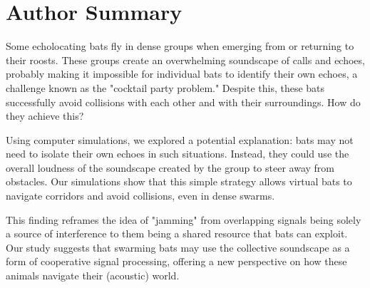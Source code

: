 \documentclass[a4paper, 11pt]{article}
\begin{document}
\begin{abstract}
    Some echolocating bats, such as \textit{Tadarida brasiliensis}, fly in groups when emerging from or entering caves. In large, dense swarms, distinguishing self-generated echoes from the multitude of calls and echoes produced by others presents a significant challenge -- akin to a cocktail party nightmare. While spectral jamming responses have been proposed as a solution, this mechanism is unlikely to be effective in such conditions. Here, we propose an alternative hypothesis: rather than isolating their own echoes, bats might navigate by relying on the local amplitude gradient of the collective soundscape. To test this, we developed an agent-based simulation of bats flying through corridors, demonstrating that they can avoid obstacles, including other bats and corridor walls, without distinguishing individual echoes. Our findings suggest that in dense swarms, bats can exploit the emergent acoustic environment to maintain safe distances passively. The current paper also suggests shifting the perspective on jamming itself. Rather than framing overlapping signals solely as a source of interference, our findings highlight that these signals can also carry useful information, reframing the problem from conflict to cooperative signal processing.
\end{abstract}

\section{Author Summary}

Some echolocating bats fly in dense groups when emerging from or returning to their roosts. These groups create an overwhelming soundscape of calls and echoes, probably making it impossible for individual bats to identify their own echoes, a challenge known as the "cocktail party problem." Despite this, these bats successfully avoid collisions with each other and with their surroundings. How do they achieve this?

Using computer simulations, we explored a potential explanation: bats may not need to isolate their own echoes in such situations. Instead, they could use the overall loudness of the soundscape created by the group to steer away from obstacles. Our simulations show that this simple strategy allows virtual bats to navigate corridors and avoid collisions, even in dense swarms.

This finding reframes the idea of "jamming" from overlapping signals being solely a source of interference to them being a shared resource that bats can exploit. Our study suggests that swarming bats may use the collective soundscape as a form of cooperative signal processing, offering a new perspective on how these animals navigate their (acoustic) world.
\end{document}

